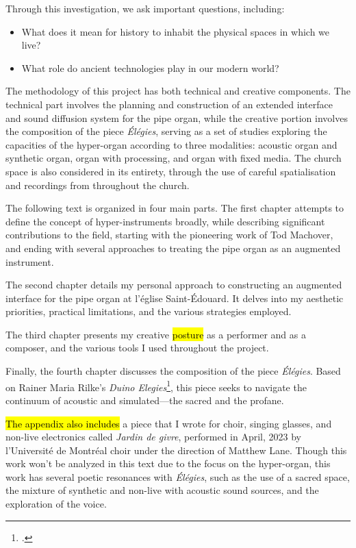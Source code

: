 \documentclass[12pt,twoside,maitrise]{dms_ks}
\theoremstyle{definition}
\begin{document}
Through this investigation, we ask important questions, including:
\begin{itemize}
    \item What does it mean for history to inhabit the physical spaces in which we live?
    \item What role do ancient technologies play in our modern world?
\end{itemize}

The methodology of this project has both technical and creative components. 
The technical part involves the planning and construction of an extended interface and sound diffusion system for the pipe organ, while the creative portion involves the composition of the piece \textit{Élégies}, serving as a set of studies exploring the capacities of the hyper-organ according to three modalities: acoustic organ and synthetic organ, organ with processing, and organ with fixed media. 
The church space is also considered in its entirety, through the use of careful spatialisation and recordings from throughout the church.									

The following text is organized in four main parts. 
The first chapter attempts to define the concept of hyper-instruments broadly, while describing significant contributions to the field, starting with the pioneering work of Tod Machover, and ending with several approaches to treating the pipe organ as an augmented instrument.

The second chapter details my personal approach to constructing an augmented interface for the pipe organ at l’église Saint-Édouard. 
It delves into my aesthetic priorities, practical limitations, and the various strategies employed. 

The third chapter presents my creative \hl{posture} as a performer and as a composer, and the various tools I used throughout the project. 

Finally, the fourth chapter discusses the composition of the piece \textit{Élégies}. 
Based on Rainer Maria Rilke's \textit{Duino Elegies}\footcite{rilke_egies_1986}, this piece seeks to navigate the continuum of acoustic and simulated---the sacred and the profane.

\hl{The appendix also includes} a piece that I wrote for choir, singing glasses, and non-live electronics called \textit{Jardin de givre}, performed in April, 2023 by l'Université de Montréal choir under the direction of Matthew Lane. Though this work won't be analyzed in this text due to the focus on the hyper-organ, this work has several poetic resonances with \textit{Élégies}, such as the use of a sacred space, the mixture of synthetic and non-live with acoustic sound sources, and the exploration of the voice.
\end{document}
